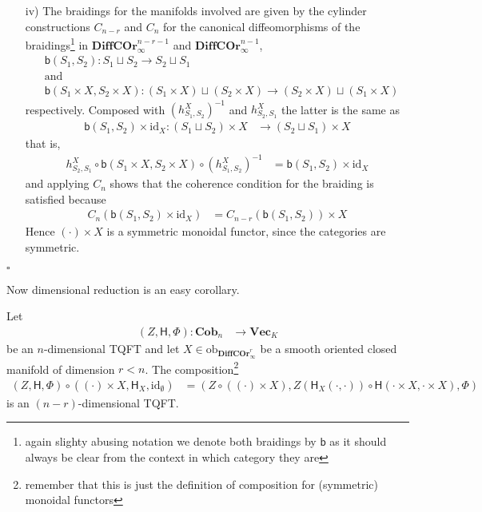 \begin{prf}[Sketch]
\begin{enumerate}
\item[iv)]
The braidings for the manifolds involved are given by the cylinder constructions $C_{n - r}$ and $C_{n}$ for the canonical diffeomorphisms of the braidings\footnote{again slighty abusing notation we denote both braidings by $\mathsf{b}$ as it should always be clear from the context in which category they are} in $\mathbf{DiffCOr}_{\infty}^{n - r - 1}$ and $\mathbf{DiffCOr}_{\infty}^{n - 1}$,
\begin{align*}
  &
  \mathsf{b}(S_{1},S_{2})
  \colon
  S_{1}
  \sqcup
  S_{2}
  \to
  S_{2}
  \sqcup
  S_{1}
  \\
  &
  \text{and}
  \\
  &
  \mathsf{b}(S_{1} \times X,S_{2} \times X)
  \colon
  (S_{1} \times X)
  \sqcup
  (S_{2} \times X)
  \to
  (S_{2} \times X)
  \sqcup
  (S_{1} \times X)
\end{align*}
respectively. Composed with $(h_{S_{1},S_{2}}^{X})^{-1}$ and $h_{S_{2},S_{1}}^{X}$ the latter is the same as
\begin{align*}
  \mathsf{b}(S_{1},S_{2})
  \times
  \mathrm{id}_{X}
  \colon
  (S_{1} \sqcup S_{2})
  \times
  X
  &\to
  (S_{2} \sqcup S_{1})
  \times X
\end{align*}
that is,
\begin{align*}
  h_{S_{2},S_{1}}^{X}
  \circ
  \mathsf{b}(S_{1} \times X,S_{2} \times X)
  \circ
  (h_{S_{1},S_{2}}^{X})^{-1}
  &=
  \mathsf{b}(S_{1},S_{2})
  \times
  \mathrm{id}_{X}
\end{align*}
and applying $C_{n}$ shows that the coherence condition for the braiding is satisfied because
\begin{align*}
  C_{n}(\mathsf{b}(S_{1},S_{2}) \times \mathrm{id}_{X})
  &=
  C_{n - r}(\mathsf{b}(S_{1},S_{2}))
  \times
  X
\end{align*}
Hence $(\cdot) \times X$ is a symmetric monoidal functor, since the categories are symmetric.
\end{enumerate}
\phantom{proven}
\hfill
$\square$
\end{prf}
Now dimensional reduction is an easy corollary.
\\
\begin{cor}
\label{cor:dimred}
Let
\begin{align*}
  (Z,\mathsf{H},\Phi)
  \colon
  \mathbf{Cob}_{n}
  &\to
  \mathbf{Vec}_{K}
\end{align*}
be an $n$-dimensional TQFT and let $X \in \mathrm{ob}_{\mathbf{DiffCOr}_{\infty}^{r}}$ be a smooth oriented closed manifold of dimension $r < n$. The composition\footnote{remember that this is just the definition of composition for (symmetric) monoidal functors}
\begin{align*}
  (Z,\mathsf{H},\Phi)
  \circ
  \left(
    (\cdot)
    \times
    X
    ,
    \mathsf{H}_{X}
    ,
    \mathrm{id}_{\emptyset}
  \right)
  &=
  \left(
    Z
    \circ
    ((\cdot) \times X)
    ,
    Z(\mathsf{H}_{X}(\cdot,\cdot))
    \circ
    \mathsf{H}(\cdot \times X,\cdot \times X)
    ,
    \Phi
  \right)
\end{align*}
is an $(n - r)$-dimensional TQFT.
\end{cor}
